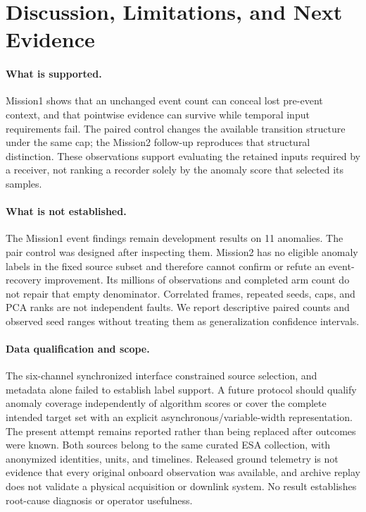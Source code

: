 \section{Discussion, Limitations, and Next Evidence}
\label{sec:limitations}
\paragraph{What is supported.}
Mission1 shows that an unchanged event count can conceal lost pre-event context,
and that pointwise evidence can survive while temporal input requirements fail.
The paired control changes the available transition structure under the same cap;
the Mission2 follow-up reproduces that structural distinction. These observations
support evaluating the retained inputs required by a receiver, not ranking a
recorder solely by the anomaly score that selected its samples.

\paragraph{What is not established.}
The Mission1 event findings remain development results on 11 anomalies. The pair
control was designed after inspecting them. Mission2 has no eligible anomaly
labels in the fixed source subset and therefore cannot confirm or refute an event-
recovery improvement. Its millions of observations and completed arm count do not
repair that empty denominator. Correlated frames, repeated seeds, caps, and PCA
ranks are not independent faults. We report descriptive paired counts and observed
seed ranges without treating them as generalization confidence intervals.

\paragraph{Data qualification and scope.}
The six-channel synchronized interface constrained source selection, and metadata
alone failed to establish label support. A future protocol should qualify anomaly
coverage independently of algorithm scores or cover the complete intended target
set with an explicit asynchronous/variable-width representation. The present
attempt remains reported rather than being replaced after outcomes were known.
Both sources belong to the same curated ESA collection, with anonymized identities,
units, and timelines. Released ground telemetry is not evidence that every original
onboard observation was available, and archive replay does not validate a physical
acquisition or downlink system. No result establishes root-cause diagnosis or
operator usefulness.

